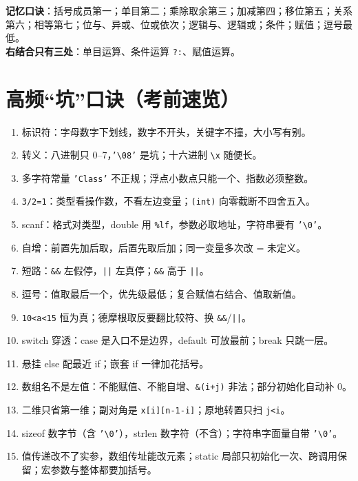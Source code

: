 \documentclass[UTF8,zihao=-4,a4paper]{ctexart}
\begin{document}
\noindent\textbf{记忆口诀}：括号成员第一；单目第二；乘除取余第三；加减第四；移位第五；关系第六；相等第七；位与、异或、位或依次；逻辑与、逻辑或；条件；赋值；逗号最低。\\
\textbf{右结合只有三处}：单目运算、条件运算 \texttt{?:}、赋值运算。

\section{高频“坑”口诀（考前速览）}

\begin{keybox}[15 条口诀]
\begin{enumerate}
  \item 标识符：字母数字下划线，数字不开头，关键字不撞，大小写有别。
  \item 转义：八进制只 0–7，\texttt{'\textbackslash 08'} 是坑；十六进制 \texttt{\textbackslash x} 随便长。
  \item 多字符常量 \texttt{'Class'} 不正规；浮点小数点只能一个、指数必须整数。
  \item \texttt{3/2=1}：类型看操作数，不看左边变量；\texttt{(int)} 向零截断不四舍五入。
  \item scanf：格式对类型，double 用 \texttt{\%lf}，参数必取地址，字符串要有 \texttt{'\textbackslash 0'}。
  \item 自增：前置先加后取，后置先取后加；同一变量多次改 = 未定义。
  \item 短路：\texttt{\&\&} 左假停，\texttt{||} 左真停；\texttt{\&\&} 高于 \texttt{||}。
  \item 逗号：值取最后一个，优先级最低；复合赋值右结合、值取新值。
  \item \texttt{10<a<15} 恒为真；德摩根取反要翻比较符、换 \texttt{\&\&}/\texttt{||}。
  \item switch 穿透：case 是入口不是边界，default 可放最前；break 只跳一层。
  \item 悬挂 else 配最近 if；嵌套 if 一律加花括号。
  \item 数组名不是左值：不能赋值、不能自增、\texttt{\&(i+j)} 非法；部分初始化自动补 0。
  \item 二维只省第一维；副对角是 \texttt{x[i][n-1-i]}；原地转置只扫 \texttt{j<i}。
  \item sizeof 数字节（含 \texttt{'\textbackslash 0'}），strlen 数字符（不含）；字符串字面量自带 \texttt{'\textbackslash 0'}。
  \item 值传递改不了实参，数组传址能改元素；static 局部只初始化一次、跨调用保留；宏参数与整体都要加括号。
\end{enumerate}
\end{keybox}
\end{document}
